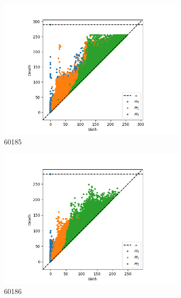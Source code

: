 \documentclass[10pt]{beamer}
\begin{document}
\begin{frame}[fragile]{}
\begin{figure}[ht]
  \centering
  \begin{subfigure}{.5 \linewidth}
    \includegraphics[scale=0.3]{persistence_diagrams/60185_multi_ph.png}
    \caption{60185}
  \end{subfigure}%
  \begin{subfigure}{.5 \linewidth}
    \includegraphics[scale=0.3]{persistence_diagrams/60186_multi_ph.png}
    \caption{60186}
  \end{subfigure}
  \begin{subfigure}{.5 \linewidth}

\end{subfigure}
\end{figure}
\end{frame}
\end{document}
